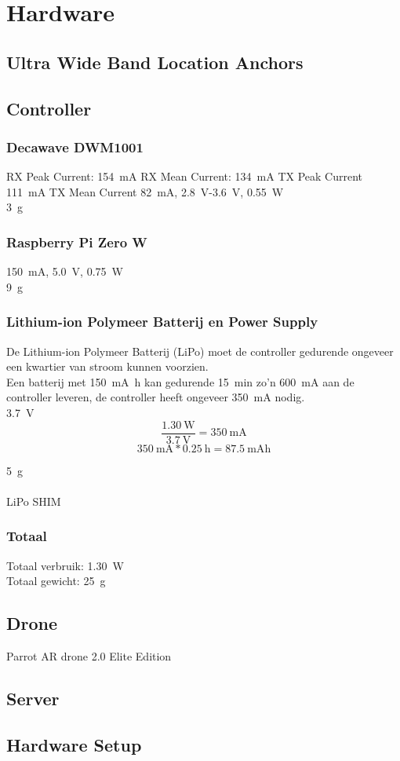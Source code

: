 \chapter{Hardware}

\section{Ultra Wide Band Location Anchors}


\section{Controller}
\subsection{Decawave DWM1001}
RX Peak Current: \SI{154}{\mA} RX Mean Current: \SI{134}{\mA} TX Peak Current \SI{111}{\mA} TX Mean Current \SI{82}{mA}, \SI{2.8}{\V}-\SI{3.6}{\V}, \SI{0.55}{\W}\\
\SI{3}{\g}

\subsection{Raspberry Pi Zero W}
\SI{150}{\mA}, \SI{5.0}{\V}, \SI{0.75}{\W}\\
\SI{9}{\g}

\subsection{Lithium-ion Polymeer Batterij en Power Supply}
De Lithium-ion Polymeer Batterij (LiPo) moet de controller gedurende ongeveer een kwartier van stroom kunnen voorzien.\\
Een batterij met \SI{150}{\mA\hour} kan gedurende \SI{15}{\minute} zo'n \SI{600}{\mA} aan de controller leveren, de controller heeft ongeveer \SI{350}{\mA} nodig.\\
\SI{3.7}{\V}\\
\[\frac{\SI{1.30}{\W}}{\SI{3.7}{\V}}=\SI{350}{\mA}\]
\[\SI{350}{\mA}*\SI{0.25}{\hour}=\SI{87.5}{\mA\hour}\]

\SI{5}{\g}\\
\\
LiPo SHIM

\subsection{Totaal}
Totaal verbruik: \SI{1.30}{\W}\\
Totaal gewicht: \SI{25}{\g}

\section{Drone}
Parrot AR drone 2.0 Elite Edition

\section{Server}


\section{Hardware Setup}

